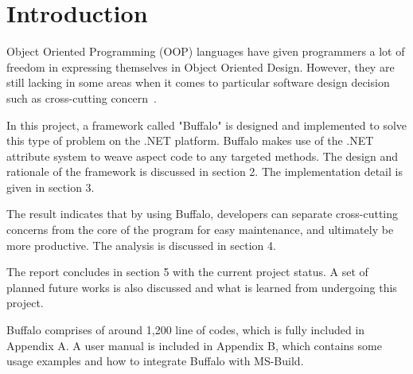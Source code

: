 \chapter{Introduction}

Object Oriented Programming (OOP) languages have given programmers a lot of freedom in expressing themselves in Object Oriented Design. However, they are still lacking in some areas when it comes to particular software design decision such as cross-cutting concern~\cite{aop}.

In this project, a framework called "Buffalo" is designed and implemented to solve this type of problem on the .NET platform. Buffalo makes use of the .NET attribute system to weave aspect code to any targeted methods. The design and rationale of the framework is discussed in section 2. The implementation detail is given in section 3.

The result indicates that by using Buffalo, developers can separate cross-cutting concerns from the core of the program for easy maintenance, and ultimately be more productive. The analysis is discussed in section 4.

The report concludes in section 5 with the current project status. A set of planned future works is also discussed and what is learned from undergoing this project.

Buffalo comprises of around 1,200 line of codes, which is fully included in Appendix A. A user manual is included in Appendix B, which contains some usage examples and how to integrate Buffalo with MS-Build.
